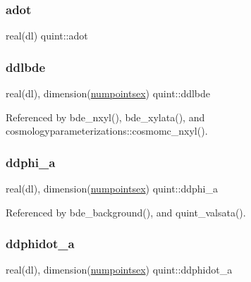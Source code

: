 \mbox{\label{namespacequint_a0574a45f7095364017aa3ff788ea374a}} 
\subsubsection{\texorpdfstring{adot}{adot}}
{\footnotesize\ttfamily real(dl) quint\+::adot}

\mbox{\label{namespacequint_a64e99c9feaf4cb920180f5be428745a6}} 
\subsubsection{\texorpdfstring{ddlbde}{ddlbde}}
{\footnotesize\ttfamily real(dl), dimension(\mbox{\hyperlink{namespacequint_a8388814d2fb6e0f54431a7257a8f86a9}{numpointsex}}) quint\+::ddlbde}



Referenced by bde\+\_\+nxyl(), bde\+\_\+xylata(), and cosmologyparameterizations\+::cosmomc\+\_\+nxyl().

\mbox{\label{namespacequint_adb002db0bc26b007d62ea6582a5fc58f}} 
\subsubsection{\texorpdfstring{ddphi\+\_\+a}{ddphi\_a}}
{\footnotesize\ttfamily real(dl), dimension(\mbox{\hyperlink{namespacequint_a8388814d2fb6e0f54431a7257a8f86a9}{numpointsex}}) quint\+::ddphi\+\_\+a}



Referenced by bde\+\_\+background(), and quint\+\_\+valsata().

\mbox{\label{namespacequint_a4dd7a485719c132a01ed439f30c1f866}} 
\subsubsection{\texorpdfstring{ddphidot\+\_\+a}{ddphidot\_a}}
{\footnotesize\ttfamily real(dl), dimension(\mbox{\hyperlink{namespacequint_a8388814d2fb6e0f54431a7257a8f86a9}{numpointsex}}) quint\+::ddphidot\+\_\+a}



